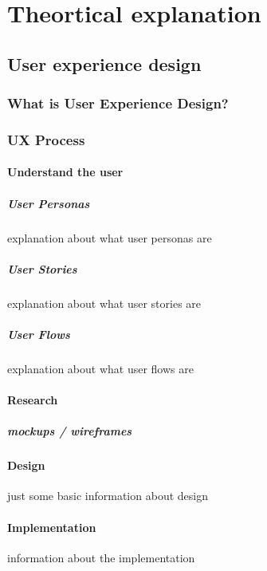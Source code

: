 \chapter{Theortical explanation}

\section{User experience design}
    \subsection{What is User Experience Design?}
    \subsection{UX Process}
    \subsubsection{Understand the user}
    \paragraph{User Personas}
    explanation about what user personas are
    \paragraph{User Stories}
    explanation about what user stories are
    \paragraph{User Flows}
    explanation about what user flows are
    
    \subsubsection{Research}
    \paragraph{mockups / wireframes}
    
    \subsubsection{Design}
    just some basic information about design
    
    \subsubsection{Implementation}
    information about the implementation
    
